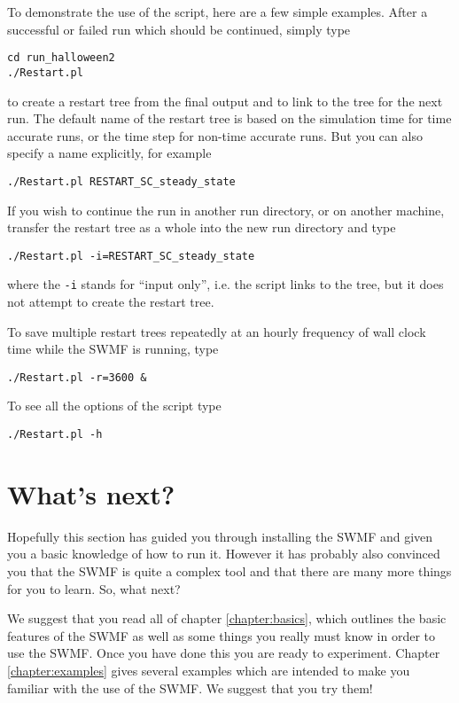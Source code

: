 To demonstrate the use of the script, here are a few simple examples.
After a successful or failed run which should be continued, simply type
\begin{verbatim}
cd run_halloween2
./Restart.pl
\end{verbatim}
to create a restart tree from the final output and to link to the tree for the
next run. The default name of the restart tree is based on the simulation time
for time accurate runs, or the time step for non-time accurate runs.
But you can also specify a name explicitly, for example
\begin{verbatim}
./Restart.pl RESTART_SC_steady_state
\end{verbatim}
If you wish to continue the run in another run directory, or on another
machine, transfer the restart tree as a whole into the new run
directory and type
\begin{verbatim}
./Restart.pl -i=RESTART_SC_steady_state
\end{verbatim}
where the {\tt -i} stands for ``input only'', i.e. the script links to
the tree, but it does not attempt to create the restart tree.

To save multiple restart trees repeatedly at an hourly frequency of 
wall clock time while the SWMF is running, type
\begin{verbatim}
./Restart.pl -r=3600 &
\end{verbatim}
To see all the options of the script type
\begin{verbatim}
./Restart.pl -h
\end{verbatim}

\section{What's next?}

Hopefully this section has guided you through installing the SWMF and
given you a basic knowledge of how to run it.  However it has probably
also convinced you that the SWMF is quite a complex tool and that there
are many more things for you to learn.  So, what next?

We suggest that you read all of chapter \ref{chapter:basics}, which
outlines the basic features of the SWMF as well as some things you
really must know in order to use the SWMF.  Once you have done this you
are ready to experiment.  Chapter \ref{chapter:examples} gives several 
examples which are intended to make you familiar with the use of the
SWMF.  We suggest that you try them!

%
